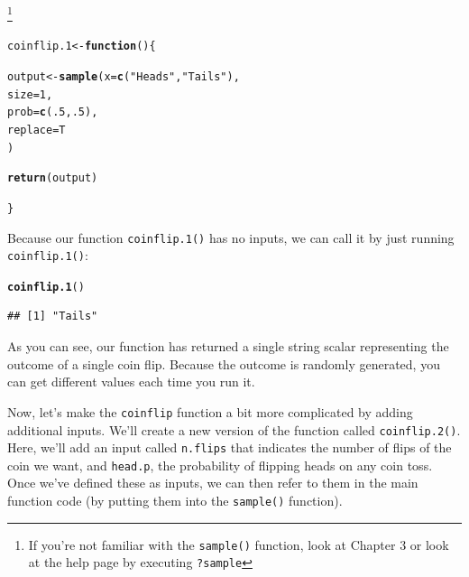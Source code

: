 \documentclass{tufte-book}\usepackage[]{graphicx}\usepackage[]{color}
\makeatletter
\newcommand{\hlnum}[1]{\textcolor[rgb]{0.686,0.059,0.569}{#1}}%
\newcommand{\hlstr}[1]{\textcolor[rgb]{0.192,0.494,0.8}{#1}}%
\newcommand{\hlstd}[1]{\textcolor[rgb]{0.345,0.345,0.345}{#1}}%
\newcommand{\hlkwa}[1]{\textcolor[rgb]{0.161,0.373,0.58}{\textbf{#1}}}%
\newcommand{\hlkwb}[1]{\textcolor[rgb]{0.69,0.353,0.396}{#1}}%
\newcommand{\hlkwc}[1]{\textcolor[rgb]{0.333,0.667,0.333}{#1}}%
\newcommand{\hlkwd}[1]{\textcolor[rgb]{0.737,0.353,0.396}{\textbf{#1}}}%
\newenvironment{kframe}{%
 \def\at@end@of@kframe{}%
 \ifinner\ifhmode%
  \def\at@end@of@kframe{\end{minipage}}%
  \begin{minipage}{\columnwidth}%
 \fi\fi%
 \def\FrameCommand##1{\hskip\@totalleftmargin \hskip-\fboxsep
 \colorbox{shadecolor}{##1}\hskip-\fboxsep
     \hskip-\linewidth \hskip-\@totalleftmargin \hskip\columnwidth}%
 \MakeFramed {\advance\hsize-\width
   \@totalleftmargin\z@ \linewidth\hsize
   \@setminipage}}%
 {\par\unskip\endMakeFramed%
 \at@end@of@kframe}
\newenvironment{knitrout}{}{} %
\makeatother
\begin{document}
\begin{footnotesize}
\footnote{If you're not familiar with the \texttt{sample()} function, look at Chapter 3 or look at the help page by executing \texttt{?sample}}

\begin{knitrout}
\color{fgcolor}\begin{kframe}
\begin{alltt}
\hlstd{coinflip.1} \hlkwb{<-} \hlkwa{function} \hlstd{() \{}

  \hlstd{output} \hlkwb{<-} \hlkwd{sample}\hlstd{(}\hlkwc{x} \hlstd{=} \hlkwd{c}\hlstd{(}\hlstr{"Heads"}\hlstd{,} \hlstr{"Tails"}\hlstd{),}
                   \hlkwc{size} \hlstd{=} \hlnum{1}\hlstd{,}
                   \hlkwc{prob} \hlstd{=} \hlkwd{c}\hlstd{(}\hlnum{.5}\hlstd{,} \hlnum{.5}\hlstd{),}
                   \hlkwc{replace} \hlstd{= T}
                   \hlstd{)}

  \hlkwd{return}\hlstd{(output)}

\hlstd{\}}
\end{alltt}
\end{kframe}
\end{knitrout}

Because our function \texttt{coinflip.1()} has no inputs, we can call it by just running \texttt{coinflip.1()}:

\begin{knitrout}
\color{fgcolor}\begin{kframe}
\begin{alltt}
\hlkwd{coinflip.1}\hlstd{()}
\end{alltt}
\begin{verbatim}
## [1] "Tails"
\end{verbatim}
\end{kframe}
\end{knitrout}

As you can see, our function has returned a single string scalar representing the outcome of a single coin flip. Because the outcome is randomly generated, you can get different values each time you run it.

Now, let's make the \texttt{coinflip} function a bit more complicated by adding additional inputs. We'll create a new version of the function called \texttt{coinflip.2()}. Here, we'll add an input called \texttt{n.flips} that indicates the number of flips of the coin we want, and \texttt{head.p}, the probability of flipping heads on any coin toss. Once we've defined these as inputs, we can then refer to them in the main function code (by putting them into the \texttt{sample()} function).


\end{footnotesize}
\end{document}
